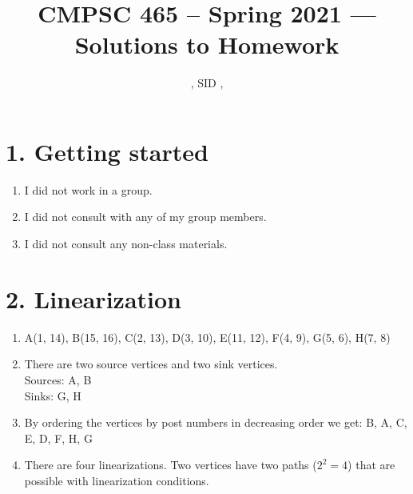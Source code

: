 \documentclass[11pt]{article}
\title{CMPSC 465 -- Spring 2021 --- Solutions to Homework \Homework}
\author{\Name, SID \SID, \texttt{\Login}}
\newenvironment{qparts}{\begin{enumerate}[{(}a{)}]}{\end{enumerate}}
\begin{document}
\maketitle


\section*{1. Getting started}
\begin{qparts}
\item
I did not work in a group.
\item
I did not consult with any of my group members.
\item
I did not consult any non-class materials.
\end{qparts}



\newpage
\section*{2. Linearization}
\begin{qparts}
\item
A(1, 14), B(15, 16), C(2, 13), D(3, 10), E(11, 12), F(4, 9), G(5, 6), H(7, 8)

\item
There are two source vertices and two sink vertices.\\ 
Sources: A, B \\
Sinks: G, H

\item
By ordering the vertices by post numbers in decreasing order we get: B, A, C, E, D, F, H, G 


\item
There are four linearizations. Two vertices have two paths ($2^2 = 4$) that are possible with linearization conditions. 


\end{qparts}


\newpage
\end{document}
